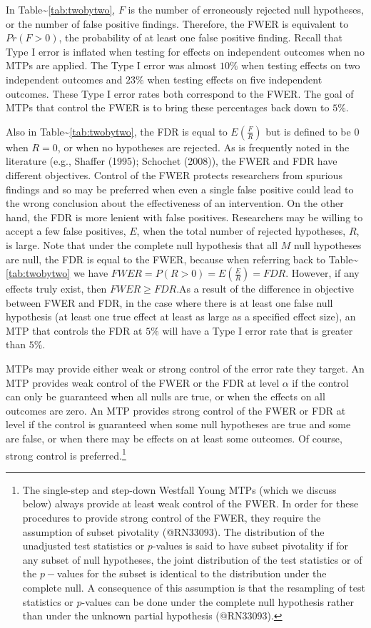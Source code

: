 \documentclass[
]{article}
\begin{document}
In Table\textasciitilde{}\ref{tab:twobytwo}, \(F\) is the number of
erroneously rejected null hypotheses, or the number of false positive
findings. Therefore, the FWER is equivalent to \(Pr(F > 0)\), the
probability of at least one false positive finding. Recall that Type I
error is inflated when testing for effects on independent outcomes when
no MTPs are applied. The Type I error was almost \(10\%\) when testing
effects on two independent outcomes and \(23\%\) when testing effects on
five independent outcomes. These Type I error rates both correspond to
the FWER. The goal of MTPs that control the FWER is to bring these
percentages back down to \(5\%\).

Also in Table\textasciitilde{}\ref{tab:twobytwo}, the FDR is equal to
\(E(\frac{F}{R})\) but is defined to be \(0\) when \(R=0\), or when no
hypotheses are rejected. As is frequently noted in the literature (e.g.,
Shaffer (1995); Schochet (2008)), the FWER and FDR have different
objectives. Control of the FWER protects researchers from spurious
findings and so may be preferred when even a single false positive could
lead to the wrong conclusion about the effectiveness of an intervention.
On the other hand, the FDR is more lenient with false positives.
Researchers may be willing to accept a few false positives, \(E\), when
the total number of rejected hypotheses, \(R\), is large. Note that
under the complete null hypothesis that all \(M\) null hypotheses are
null, the FDR is equal to the FWER, because when referring back to
Table\textasciitilde{}\ref{tab:twobytwo} we have
\(FWER=P(R>0)=E(\frac{E}{R})=FDR\). However, if any effects truly exist,
then \(FWER \geq FDR\).As a result of the difference in objective
between FWER and FDR, in the case where there is at least one false null
hypothesis (at least one true effect at least as large as a specified
effect size), an MTP that controls the FDR at \(5\%\) will have a Type I
error rate that is greater than \(5\%\).

MTPs may provide either weak or strong control of the error rate they
target. An MTP provides weak control of the FWER or the FDR at level
\(\alpha\) if the control can only be guaranteed when all nulls are
true, or when the effects on all outcomes are zero. An MTP provides
strong control of the FWER or FDR at level if the control is guaranteed
when some null hypotheses are true and some are false, or when there may
be effects on at least some outcomes. Of course, strong control is
preferred.\footnote{The single-step and step-down Westfall Young MTPs (which we discuss below) always provide at least weak control of the FWER.
In order for these procedures to provide strong control of the FWER, they require the assumption of subset pivotality (@RN33093).
The distribution of the unadjusted test statistics or $p$-values is said to have subset pivotality if for any subset of null hypotheses, the joint distribution of the test statistics or of the $p-$values for the subset is identical to the distribution under the complete null.
A consequence of this assumption is that the resampling of test statistics or $p$-values can be done under the complete null hypothesis rather than under the unknown partial hypothesis (@RN33093).}
\end{document}
